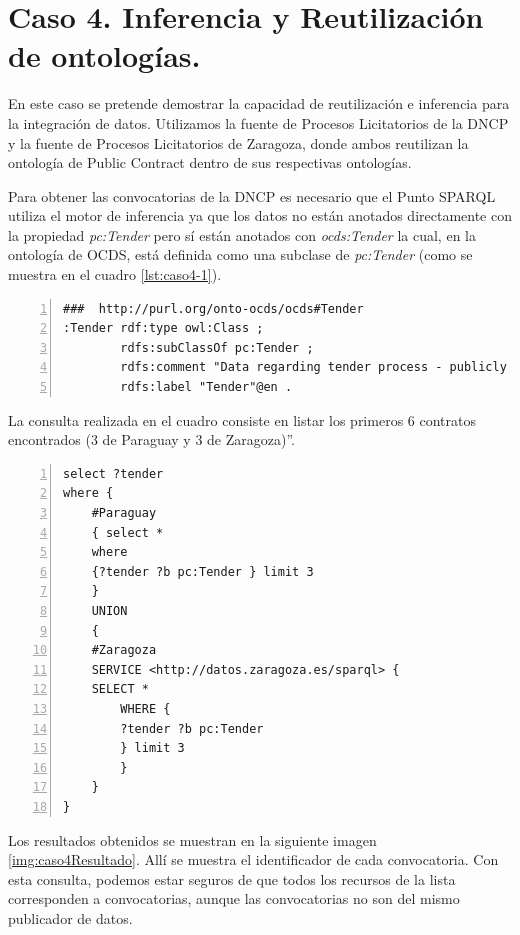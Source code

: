 \section{Caso 4. Inferencia y Reutilización de ontologías. }

En este caso se pretende demostrar la capacidad de reutilización e inferencia para la integración de datos. Utilizamos la fuente de Procesos Licitatorios de la DNCP y la fuente de Procesos Licitatorios de Zaragoza, donde ambos reutilizan la ontología de Public Contract dentro de sus respectivas ontologías.

Para obtener las convocatorias de la DNCP es necesario que el Punto SPARQL utiliza el motor de inferencia ya que los datos no están anotados directamente con la propiedad \textit{pc:Tender} pero sí están anotados con \textit{ocds:Tender} la cual, en la ontología de OCDS, está definida como una subclase de \textit{pc:Tender} (como se muestra en el cuadro \ref{lst:caso4-1}). \hfill \break

\noindent\begin{minipage}[c]{\textwidth}
\begin{lstlisting}[captionpos=b, caption=Extension de la ontologia reutilizando PC, label={lst:caso4-1},  numbers=left,  numberstyle=\tiny\color{mygray},
    basicstyle=\footnotesize\ttfamily,frame=single]
###  http://purl.org/onto-ocds/ocds#Tender
:Tender rdf:type owl:Class ;
        rdfs:subClassOf pc:Tender ;
        rdfs:comment "Data regarding tender process - publicly inviting prospective contractors to submit bids for evaluation and selecting a winner or winners"@en ;
        rdfs:label "Tender"@en .
 \end{lstlisting}
\end{minipage}
 

 La consulta realizada en el cuadro  consiste en listar los primeros 6 contratos encontrados (3 de Paraguay y 3 de Zaragoza)”.
 
\noindent\begin{minipage}[c]{\textwidth}
 \begin{lstlisting}[captionpos=b, caption=Consulta a dos fuentes de datos utilizando el mismo concepto, label={lst:caso4-2},  numbers=left,  numberstyle=\tiny\color{mygray},
    basicstyle=\footnotesize\ttfamily,frame=single]
select ?tender
where {
    #Paraguay
    { select * 
    where 
    {?tender ?b pc:Tender } limit 3 
    }
    UNION 
    { 
    #Zaragoza
    SERVICE <http://datos.zaragoza.es/sparql> {
    SELECT * 
        WHERE {
        ?tender ?b pc:Tender 
        } limit 3
        }
    }
}
 \end{lstlisting}
\end{minipage}
 Los resultados obtenidos se muestran en la siguiente imagen \ref{img:caso4Resultado}. Allí se muestra el identificador de cada convocatoria. Con esta consulta, podemos estar seguros de que todos los recursos de la lista corresponden a convocatorias, aunque las convocatorias no son del mismo publicador de datos.



